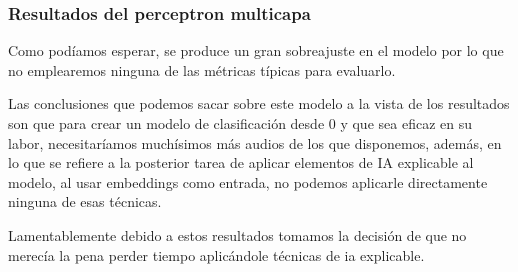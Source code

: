 \subsubsection*{Resultados del perceptron multicapa}

Como podíamos esperar, se produce un gran sobreajuste en el modelo por lo que no emplearemos ninguna de las métricas típicas para evaluarlo.

Las conclusiones que podemos sacar sobre este modelo a la vista de los resultados son que para crear un modelo de clasificación desde 0 y que sea eficaz en su labor, necesitaríamos muchísimos más audios de los que disponemos, además, en lo que se refiere a la posterior tarea de aplicar elementos de IA explicable al modelo, al usar embeddings como entrada, no podemos aplicarle directamente ninguna de esas técnicas.

Lamentablemente debido a estos resultados tomamos la decisión de que no merecía la pena perder tiempo aplicándole técnicas de ia explicable.
